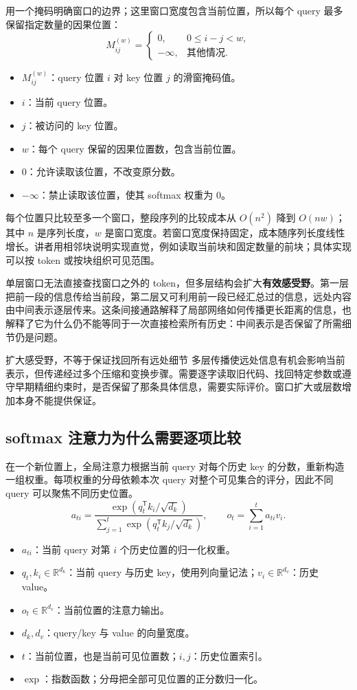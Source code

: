\documentclass[11pt,a4paper]{article}
\begin{document}
用一个掩码明确窗口的边界；这里窗口宽度包含当前位置，所以每个 query 最多保留指定数量的因果位置：
$$
M_{ij}^{(w)}=\begin{cases}
0,&0\leq i-j<w,\\
-\infty,&\text{其他情况}.
\end{cases}
$$
\begin{itemize}
\item $M_{ij}^{(w)}$：query 位置 $i$ 对 key 位置 $j$ 的滑窗掩码值。
\item $i$：当前 query 位置。
\item $j$：被访问的 key 位置。
\item $w$：每个 query 保留的因果位置数，包含当前位置。
\item $0$：允许读取该位置，不改变原分数。
\item $-\infty$：禁止读取该位置，使其 softmax 权重为 0。
\end{itemize}

每个位置只比较至多一个窗口，整段序列的比较成本从 $O(n^2)$ 降到 $O(nw)$；其中 $n$ 是序列长度，$w$ 是窗口宽度。若窗口宽度保持固定，成本随序列长度线性增长。讲者用相邻块说明实现直觉，例如读取当前块和固定数量的前块；具体实现可以按 token 或按块组织可见范围。

单层窗口无法直接查找窗口之外的 token，但多层结构会扩大\textbf{有效感受野}。第一层把前一段的信息传给当前段，第二层又可利用前一段已经汇总过的信息，远处内容由中间表示逐层传来。这条间接通路解释了局部网络如何传播更长距离的信息，也解释了它为什么仍不能等同于一次直接检索所有历史：中间表示是否保留了所需细节仍是问题。

\begin{warningbox}{扩大感受野，不等于保证找回所有远处细节}
多层传播使远处信息有机会影响当前表示，但传递经过多个压缩和变换步骤。需要逐字读取旧代码、找回特定参数或遵守早期精细约束时，是否保留了那条具体信息，需要实际评价。窗口扩大或层数增加本身不能提供保证。
\end{warningbox}

\subsection{softmax 注意力为什么需要逐项比较}

在一个新位置上，全局注意力根据当前 query 对每个历史 key 的分数，重新构造一组权重。每项权重的分母依赖本次 query 对整个可见集合的评分，因此不同 query 可以聚焦不同历史位置。
$$
a_{ti}=\frac{\exp(q_t^{\mathsf T}k_i/\sqrt{d_k})}
{\sum_{j=1}^{t}\exp(q_t^{\mathsf T}k_j/\sqrt{d_k})},\qquad
o_t=\sum_{i=1}^{t}a_{ti}v_i.
$$
\begin{itemize}
\item $a_{ti}$：当前 query 对第 $i$ 个历史位置的归一化权重。
\item $q_t,k_i\in\mathbb{R}^{d_k}$：当前 query 与历史 key，使用列向量记法；$v_i\in\mathbb{R}^{d_v}$：历史 value。
\item $o_t\in\mathbb{R}^{d_v}$：当前位置的注意力输出。
\item $d_k,d_v$：query/key 与 value 的向量宽度。
\item $t$：当前位置，也是当前可见位置数；$i,j$：历史位置索引。
\item $\exp$：指数函数；分母把全部可见位置的正分数归一化。
\end{itemize}
\end{document}
